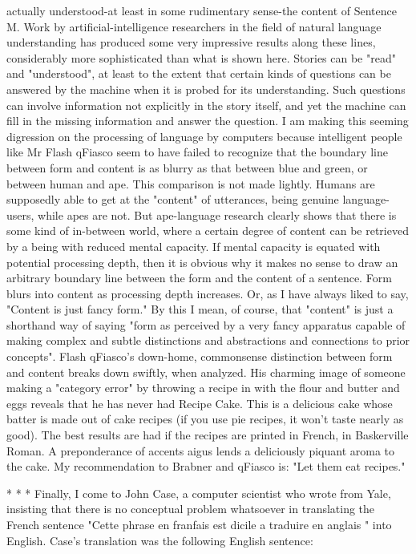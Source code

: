 actually understood-at least in some rudimentary sense-the content of Sentence M. Work
by artificial-intelligence researchers in the field of natural language understanding has
produced some very impressive results along these lines, considerably more sophisticated
than what is shown here. Stories can be "read" and "understood", at least to the extent
that certain kinds of questions can be answered by the machine when it is probed for its
understanding. Such questions can involve information not explicitly in the story itself,
and yet the machine can fill in the missing information and answer the question.
        I am making this seeming digression on the processing of language by computers
because intelligent people like Mr Flash qFiasco seem to have failed to recognize that the
boundary line between form and content is as blurry as that between blue and green, or
between human and ape. This comparison is not made lightly. Humans are supposedly
able to get at the "content" of utterances, being genuine language-users, while apes are
not. But ape-language research clearly shows that there is some kind of in-between
world, where a certain degree of content can be retrieved by a being with reduced mental
capacity. If mental capacity is equated with potential processing depth, then it is obvious
why it makes no sense to draw an arbitrary boundary line between the form and the
content of a sentence. Form blurs into content as processing depth increases. Or, as I
have always liked to say, "Content is just fancy form." By this I mean, of course, that
"content" is just a shorthand way of saying "form as perceived by a very fancy apparatus
capable of making complex and subtle distinctions and abstractions and connections to
prior concepts".
        Flash qFiasco's down-home, commonsense distinction between form and content
breaks down swiftly, when analyzed. His charming image of someone making a
"category error" by throwing a recipe in with the flour and butter and eggs reveals that he
has never had Recipe Cake. This is a delicious cake whose batter is made out of cake
recipes (if you use pie recipes, it won't taste nearly as good). The best results are had if
the recipes are printed in French, in Baskerville Roman. A preponderance of accents
aigus lends a deliciously piquant aroma to the cake. My recommendation to Brabner and
qFiasco is: "Let them eat recipes."

                                     *       *      *
        Finally, I come to John Case, a computer scientist who wrote from Yale, insisting
that there is no conceptual problem whatsoever in translating the French sentence "Cette
phrase en franfais est dicile a traduire en anglais " into English. Case's translation was
the following English sentence:

